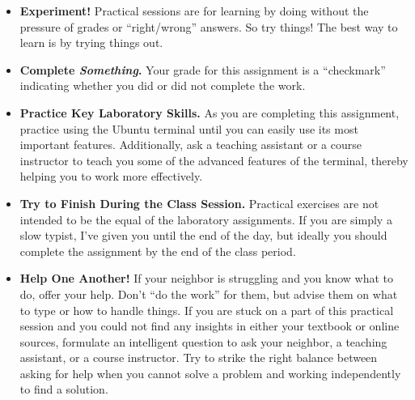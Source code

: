     
\begin{itemize}
\item {\bf Experiment!} Practical sessions are for learning by doing without the pressure of grades or ``right/wrong''  answers. So try things!  The best way to learn is by trying things out.

\item {\bf Complete \textbf{\textit{Something}}.} Your grade for this assignment is a ``checkmark'' indicating whether you did or did not complete the work.

\item {\bf Practice Key Laboratory Skills.} As you are completing this assignment, practice using the Ubuntu terminal until you can easily use its most important features.  Additionally, ask
  a teaching assistant or a course instructor to teach you some of the advanced features of the terminal, thereby helping you to work more effectively. 

\item {\bf Try to Finish During the Class Session.} Practical exercises are not intended to be the equal of the laboratory assignments. If you are simply a slow typist, I've given you until the end of the day, but ideally you should complete the assignment by the end of the class period. 

\item {\bf Help One Another!} If your neighbor is struggling and you know what to do, offer your help. Don't ``do the work'' for them, but advise them on what to type or how to handle things. If you are stuck on a part of this practical session and you could not find any insights in either your textbook or online sources, formulate an intelligent question to ask your neighbor, a teaching assistant, or a course instructor. Try to strike the right balance between asking for help when you cannot solve a problem and working independently to find a solution.
\end{itemize}


